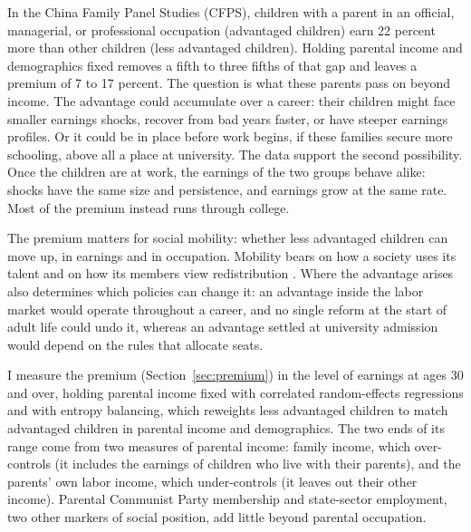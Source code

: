 \documentclass[11pt]{article}
\begin{document}
In the China Family Panel Studies (CFPS), children with a parent in an official, managerial, or professional occupation (advantaged children) earn 22 percent more than other children (less advantaged children). Holding parental income and demographics fixed removes a fifth to three fifths of that gap and leaves a premium of 7 to 17 percent. The question is what these parents pass on beyond income. The advantage could accumulate over a career: their children might face smaller earnings shocks, recover from bad years faster, or have steeper earnings profiles. Or it could be in place before work begins, if these families secure more schooling, above all a place at university. The data support the second possibility. Once the children are at work, the earnings of the two groups behave alike: shocks have the same size and persistence, and earnings grow at the same rate. Most of the premium instead runs through college.

The premium matters for social mobility: whether less advantaged children can move up, in earnings and in occupation. Mobility bears on how a society uses its talent and on how its members view redistribution \citep{AlesinaStantchevaTeso2018, BellEtAl2019, HsiehHurstJonesKlenow2019}. Where the advantage arises also determines which policies can change it: an advantage inside the labor market would operate throughout a career, and no single reform at the start of adult life could undo it, whereas an advantage settled at university admission would depend on the rules that allocate seats.

I measure the premium (Section~\ref{sec:premium}) in the level of earnings at ages 30 and over, holding parental income fixed with correlated random-effects regressions and with entropy balancing, which reweights less advantaged children to match advantaged children in parental income and demographics. The two ends of its range come from two measures of parental income: family income, which over-controls (it includes the earnings of children who live with their parents), and the parents' own labor income, which under-controls (it leaves out their other income). Parental Communist Party membership and state-sector employment, two other markers of social position, add little beyond parental occupation.
\end{document}
